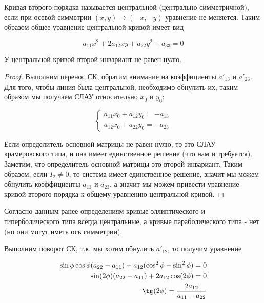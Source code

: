 \begin{definition}
  Кривая второго порядка называется центральной (центрально симметричной), если
  при осевой симметрии \((x, y) \to (-x, -y)\) уравнение не меняется. Таким
  образом общее уравнение центральной кривой имеет вид

  \begin{equation*}
    a_{11} x^2 + 2 a_{12} xy + a_{22} y^2 + a_{33} = 0
  \end{equation*}
\end{definition}

\begin{theorem}
  У центральной кривой второй инвариант не равен нулю.
\end{theorem}

\begin{proof}
  Выполним перенос СК, обратим внимание на коэффициенты \(a'_{13}\) и
  \(a'_{23}\). Для того, чтобы линия была центральной, необходимо обнулить их,
  таким образом мы получаем СЛАУ относительно \(x_0\) и \(y_0\):

  \begin{equation*}
    \begin{cases}
      a_{11} x_0 + a_{12} y_0 = - a_{13} \\
      a_{12} x_0 + a_{22} y_0 = -a_{23}
    \end{cases}
  \end{equation*}

  Если определитель основной матрицы не равен нулю, то это СЛАУ крамеровского
  типа, и она имеет единственное решение (что нам и требуется). Заметим, что
  определитель основной матрицы это второй инвариант. Таким образом, если \(I_2
  \ne 0\), то система имеет единственное решение, значит мы можем обнулить
  коэффициенты \(a_{13}\) и \(a_{23}\), а значит мы можем привести уравнение
  кривой второго порядка к общему уравнению центральной кривой.
\end{proof}

\begin{remark}
  Согласно данным ранее определениям кривые эллиптического и гиперболического
  типа всегда центральные, а кривые параболического типа - нет (но они могут
  иметь ось симметрии).
\end{remark}


Выполним поворот СК, т.к. мы хотим обнулить \(a'_{12}\), то получим уравнение

\begin{equation*}
  \begin{aligned}
    \sin \phi \cos \phi (a_{22} - a_{11})
    + a_{12} (\cos^2 \phi - \sin^2 \phi) = 0
  \\
    \sin (2 \phi) (a_{22} - a_{11}) + 2 a_{12} \cos (2 \phi) = 0
  \\
    \tg (2 \phi) = \frac{2 a_{12}}{a_{11} - a_{22}}
  \end{aligned}
\end{equation*}

